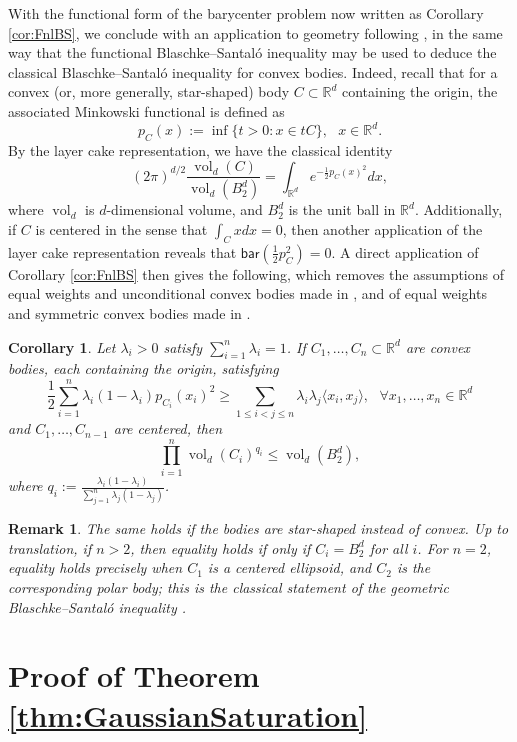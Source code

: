 \documentclass[10pt]{article}
\newtheorem{remark}[theorem]{Remark}
\newtheorem{corollary}[theorem]{Corollary}
\newcommand{\bary}{\mathsf{bar}}
\begin{document}
With the functional form of the barycenter problem now written as Corollary \ref{cor:FnlBS}, we conclude with an  application to  geometry following \cite[Section 5]{KW}, in the same way that the functional Blaschke--Santal\'o inequality may be used to deduce the classical Blaschke--Santal\'o inequality for convex bodies.   Indeed, recall that for a convex (or, more generally, star-shaped) body $C\subset \mathbb{R}^d$ containing the origin, the associated Minkowski functional is defined as
$$
p_C(x) := \inf\{ t> 0 : x \in t C\}, ~~~x\in \mathbb{R}^d.
$$
By the layer cake representation, we have the  classical identity
$$
(2 \pi)^{d/2}\frac{\operatorname{vol}_d(C) }{\operatorname{vol}_d(B_2^d)} = \int_{\mathbb{R}^d} e^{-\frac{1}{2}p_C(x)^2}dx,
$$
where $\operatorname{vol}_d$ is $d$-dimensional volume, and $B_2^d$ is the unit ball in $\mathbb{R}^d$.  Additionally, if $C$ is centered in the sense that  $\int_C x dx=0$, then another application of the layer cake representation reveals that $\bary( \frac{1}{2}p_C^2) = 0$.  A direct application of Corollary \ref{cor:FnlBS} then gives the following, which removes the  assumptions of equal weights and unconditional convex bodies made in \cite{KW}, and of equal weights and symmetric convex bodies made in \cite{NT}.


\begin{corollary}
Let $\lambda_i >  0$ satisfy $\sum_{i=1}^n \lambda_i = 1$.  If $C_1, \dots, C_n \subset \mathbb{R}^d$ are convex bodies, each containing the origin, satisfying 
$$
\frac{1}{2}\sum_{i=1}^n \lambda_i (1-\lambda_i) p_{C_i}(x_i)^2 \geq   \sum_{1\leq i < j \leq n} \lambda_i \lambda_j \langle x_i, x_j \rangle, ~~~\forall x_1, \dots, x_n \in \mathbb{R}^d
$$
and $C_1, \dots, C_{n-1}$ are centered, then 
$$
\prod_{i=1}^n \operatorname{vol}_d(C_i)^{q_i}  \leq  \operatorname{vol}_d(B_2^d) ,
$$
where $q_i := \frac{\lambda_i (1-\lambda_i) }{ \sum_{j=1}^n \lambda_j(1-\lambda_j) } $.
\end{corollary}
\begin{remark}The same holds if the bodies are star-shaped instead of convex.  Up to translation, if $n>2$, then  equality holds if only if $C_i = B_2^d$ for all $i$.  For $n=2$, equality holds precisely when $C_1$ is a centered ellipsoid, and $C_2$ is the corresponding polar body; this is the classical statement of the geometric Blaschke--Santal\'o inequality \cite{Santalo}.  
\end{remark}


 \section{Proof of Theorem \ref{thm:GaussianSaturation}}
\end{document}
